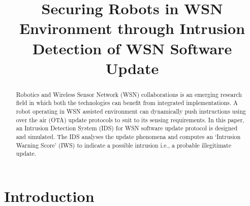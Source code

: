 \documentclass[conference,final]{IEEEtran}
\begin{document}
\title{Securing Robots in WSN Environment through Intrusion Detection of WSN Software Update}

\author{
}



\maketitle

\begin{abstract}
Robotics and  Wireless Sensor Network (WSN) collaborations is an emerging research field in which both the technologies can benefit from integrated implementations.
A robot operating in WSN assisted environment can dynamically push instructions using over the air (OTA) update protocols to suit to its sensing requirements.
In this paper, an Intrusion Detection System (IDS) for WSN  software update protocol is designed and simulated. 
The IDS analyses the update phenomena and computes an `Intrusion Warning Score' (IWS) to indicate a possible intrusion i.e., a probable illegitimate update.
\end{abstract}





\section{Introduction}
\label{sec:intro}
\end{document}
